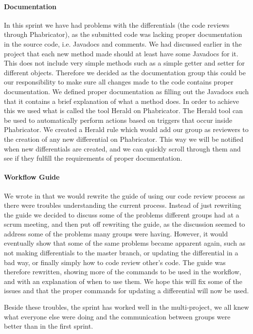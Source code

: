 \paragraph{Documentation}
In this sprint we have had problems with the differentials (the code reviews through Phabricator), as the submitted code was lacking proper documentation in the source code, i.e. Javadocs and comments. 
We had discussed earlier in the project that each new method made should at least have some Javadocs for it.
This does not include very simple methods such as a simple getter and setter for different objects.
Therefore we decided as the documentation group this could be our responsibility to make sure all changes made to the code contains proper documentation.
We defined proper documentation as filling out the Javadocs such that it contains a brief explanation of what a method does.
In order to achieve this we used what is called the tool Herald on Phabricator.
The Herald tool can be used to automatically perform actions based on triggers that occur inside Phabricator.
We created a Herald rule which would add our group as reviewers to the creation of any new differential on Phabricator.
This way we will be notified when new differentials are created, and we can quickly scroll through them and see if they fulfill the requirements of proper documentation.

\paragraph{Workflow Guide}
We wrote in  that we would rewrite the guide of using our code review process as there were troubles understanding the current process.
Instead of just rewriting the guide we decided to discuss some of the problems different groups had at a scrum meeting, and then put off rewriting the guide, as the discussion seemed to address some of the problems many groups were having.
However, it would eventually show that some of the same problems became apparent again, such as not making differentials to the master branch, or updating the differential in a bad way, or finally simply how to code review other's code.
The guide was therefore rewritten, showing more of the commands to be used in the workflow, and with an explanation of when to use them.
We hope this will fix some of the issues and that the proper commands for updating a differential will now be used.

Beside these troubles, the sprint has worked well in the multi-project, we all knew what everyone else were doing and the communication between groups were better than in the first sprint.
